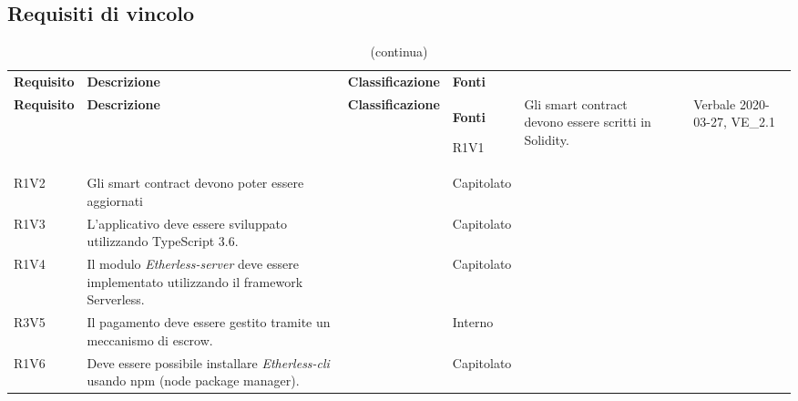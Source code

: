 \subsection{Requisiti di vincolo}

\def\arraystretch{1.75}
\begin{longtable}{ 
		>{\centering}p{} 
		>{}p{} 
		>{\centering}p{}
		>{\centering}p{} }
	
	\caption{Tabella dei requisiti di vincolo} \\ 
	\coloredTableHead
	\textbf{\color{white}Requisito} & 
	\centering\textbf{\color{white}Descrizione} & 
	\centering\textbf{\color{white}Classificazione} &
	\textbf{\color{white}Fonti} 
	\endfirsthead
	
	\caption[]{(continua)}\\
	\textbf{\color{white}Requisito} &
	\centering\textbf{\color{white}Descrizione} &
	\centering\textbf{\color{white}Classificazione} &
	\textbf{\color{white}Fonti} 
	\endhead
	
	R1V1 & Gli smart contract devono essere scritti in 
	Solidity.												& \ob & Verbale 2020-03-27, VE\_2.1\tabularnewline
	R1V2 & Gli smart contract devono poter essere aggiornati 				& \ob & Capitolato \tabularnewline
	R1V3 & L'applicativo deve essere sviluppato utilizzando 
		TypeScript 3.6.										& \ob & Capitolato \tabularnewline
	R1V4 & Il modulo \textit{Etherless-server} deve essere implementato 
			utilizzando il framework Serverless.
												 							& \ob & Capitolato \tabularnewline
	R3V5 & Il pagamento deve essere gestito tramite un meccanismo di escrow.	& \op & Interno \tabularnewline
	R1V6 & Deve essere possibile installare \textit{Etherless-cli} 
		usando npm (node package manager).						& \ob & Capitolato \tabularnewline
	
	
\end{longtable}